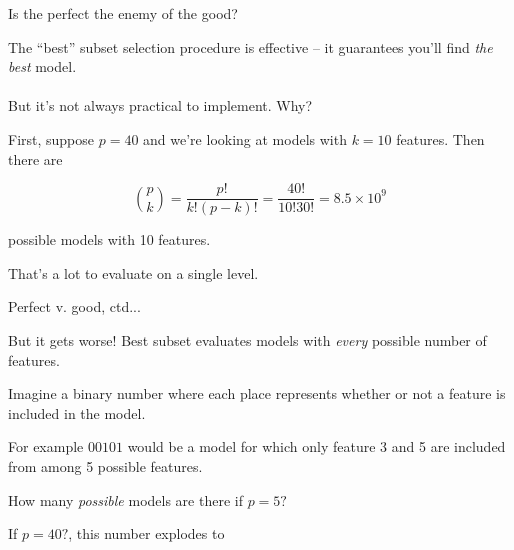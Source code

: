 \documentclass[mathserif, aspectratio=169]{beamer}
\begin{document}
\begin{frame}{Is the perfect the enemy of the good?}

The ``best'' subset selection procedure is effective -- it guarantees you'll find \textit{the best} model.\\~\\

But it's not always practical to implement.  Why?

\pause

\vspace{5mm}

First, suppose $p=40$ and we're looking at models with $k = 10$ features.  Then there are

\pause

\begin{equation}
{{p}\choose{k}} = \frac{p!}{k!(p-k)!} = \frac{40!}{10!30!} = 8.5\times 10^9
\end{equation}

\vspace{5mm}

possible models with 10 features.

\vspace{5mm}

That's a lot to evaluate on a single level.

\end{frame}

\begin{frame}{Perfect v. good, ctd...}

But it gets worse!  Best subset evaluates models with \textit{every} possible number of features.

\vspace{5mm}

Imagine a binary number where each place represents whether or not a feature is included in the model.

\vspace{5mm}

For example $00101$ would be a model for which only feature 3 and 5 are included from among 5 possible features.

\vspace{5mm}

How many \textit{possible} models are there if $p=5?$


If $p=40?$, this number explodes to 

\end{frame}
\end{document}
